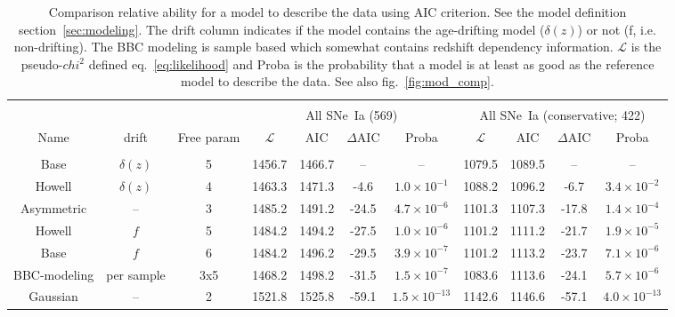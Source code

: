 \documentclass[]{aa} %
\begin{document}
\begin{table}
    \centering
    \caption{Comparison relative ability for a model to describe the data using
    AIC criterion. See the model definition section~\ref{sec:modeling}. The
drift column indicates if the model contains the age-drifting model
($\delta(z)$) or not (f, i.e. non-drifting). The BBC modeling is sample based
which somewhat contains redshift dependency information. $\mathcal{L}$ is the
pseudo-$chi^{2}$ defined eq.~\ref{eq:likelihood} and Proba is the probability
that a model is at least as good as the reference model to describe the data.
See also fig.~\ref{fig:mod_comp}.}
    \label{tab:comp}
    \begin{tabular}{c c c  |c c c c|  c c c c}\hline\hline\\[-0.8em]
        & & & \multicolumn{4}{|c}{All SNe~Ia (569)} & \multicolumn{4}{|c}{All SNe~Ia (conservative; 422)} \\
        Name & drift & Free param &
        $\mathcal{L}$ & $\mathrm{AIC}$ & $\Delta \mathrm{AIC}$ & Proba & $\mathcal{L}$ & $\mathrm{AIC}$ & $\Delta \mathrm{AIC}$ & Proba \\[0.15em]
        \hline\\[-0.8em]

        Base & $\delta(z)$ & 5
        & 1456.7 & 1466.7 & -- & --
        & 1079.5 & 1089.5 & -- & --\\[0.15em]

        Howell & $\delta(z)$ & 4
        & 1463.3 & 1471.3 & -4.6 & $1.0\times10^{-1}$
        & 1088.2 & 1096.2 & -6.7 & $3.4\times10^{-2}$\\[0.15em]

        Asymmetric & -- & 3
        & 1485.2 & 1491.2 & -24.5 & $4.7\times10^{-6}$
        & 1101.3 & 1107.3 & -17.8 & $1.4\times10^{-4}$\\[0.15em]

        Howell & $f$ & 5
        & 1484.2 & 1494.2 & -27.5 & $1.0\times10^{-6}$
        & 1101.2 & 1111.2 & -21.7 & $1.9\times10^{-5}$\\[0.15em]

        Base & $f$ & 6
        & 1484.2 & 1496.2 & -29.5 & $3.9\times10^{-7}$
        & 1101.2 & 1113.2 & -23.7 & $7.1\times10^{-6}$\\[0.15em]

        BBC-modeling & per sample & 3x5
        & 1468.2 & 1498.2 & -31.5 & $1.5\times10^{-7}$
        & 1083.6 & 1113.6 & -24.1 & $5.7\times10^{-6}$\\[0.15em]

        Gaussian & -- & 2
        & 1521.8 & 1525.8 & -59.1 & $1.5\times10^{-13}$
        & 1142.6 & 1146.6 & -57.1 & $4.0\times10^{-13}$ \\\hline\hline
    \end{tabular}
\end{table}
\end{document}

